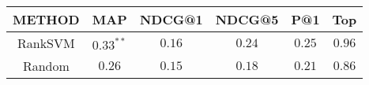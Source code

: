 \begin{tabular}{|c|c|c|c|c|c|}
\hline
METHOD & MAP & NDCG@1 & NDCG@5 & P@1 & Top\\
\hline
RankSVM & $0.33^{**}$ & $0.16$ & $0.24$ & $0.25$ & $0.96$\\ 
\hline
Random & $0.26$ & $0.15$ & $0.18$ & $0.21$ & $0.86$ \\
\hline 
\end{tabular}